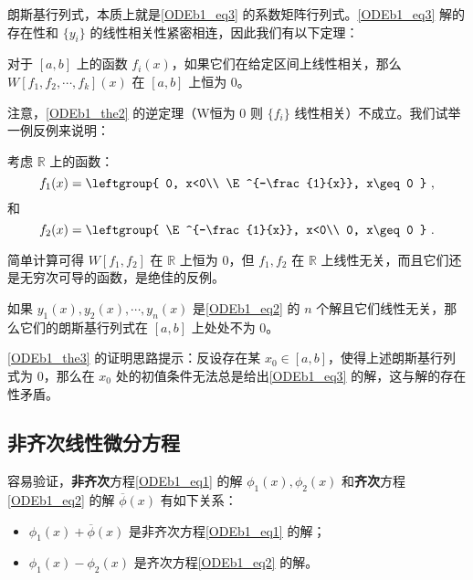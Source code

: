 朗斯基行列式，本质上就是\autoref{ODEb1_eq3} 的系数矩阵行列式。\autoref{ODEb1_eq3} 解的存在性和 $\{y_i\}$ 的线性相关性紧密相连，因此我们有以下定理：




\begin{theorem}{}\label{ODEb1_the2}
对于 $[a, b]$ 上的函数 $f_i(x)$，如果它们在给定区间上线性相关，那么 $W[f_1, f_2, \cdots, f_k](x)$ 在 $[a, b]$ 上恒为 $0$。
\end{theorem}

注意，\autoref{ODEb1_the2} 的逆定理（W恒为 $0$ 则 $\{f_i\}$ 线性相关）不成立。我们试举一例反例来说明：

\begin{example}{}
考虑 $\mathbb{R}$ 上的函数：
\begin{equation}
f_1(x)=\leftgroup{
    0, x<0\\
    \E^{-\frac{1}{x}}, x\geq 0
}~,
\end{equation}
和
\begin{equation}
f_2(x)=\leftgroup{
    \E^{-\frac{1}{x}}, x<0\\
    0, x\geq 0
}~.
\end{equation}

简单计算可得 $W[f_1, f_2]$ 在 $\mathbb{R}$ 上恒为 $0$，但 $f_1, f_2$ 在 $\mathbb{R}$ 上线性无关，而且它们还是无穷次可导的函数，是绝佳的反例。




\end{example}

\begin{theorem}{}\label{ODEb1_the3}
如果 $y_1(x), y_2(x), \cdots, y_n(x)$ 是\autoref{ODEb1_eq2} 的 $n$ 个解且它们线性无关，那么它们的朗斯基行列式在 $[a, b]$ 上处处不为 $0$。
\end{theorem}

\autoref{ODEb1_the3} 的证明思路提示：反设存在某 $x_0\in[a, b]$，使得上述朗斯基行列式为 $0$，那么在 $x_0$ 处的初值条件无法总是给出\autoref{ODEb1_eq3} 的解，这与解的存在性矛盾。




\subsection{非齐次线性微分方程}

容易验证，\textbf{非齐次}方程\autoref{ODEb1_eq1} 的解 ${\phi}_1(x), \phi_2(x)$ 和\textbf{齐次}方程\autoref{ODEb1_eq2} 的解 $\overline{\phi}(x)$ 有如下关系：
\begin{itemize}
\item $\phi_1(x)+\overline{\phi}(x)$ 是非齐次方程\autoref{ODEb1_eq1} 的解；
\item $\phi_1(x)-\phi_2(x)$ 是齐次方程\autoref{ODEb1_eq2} 的解。
\end{itemize}

